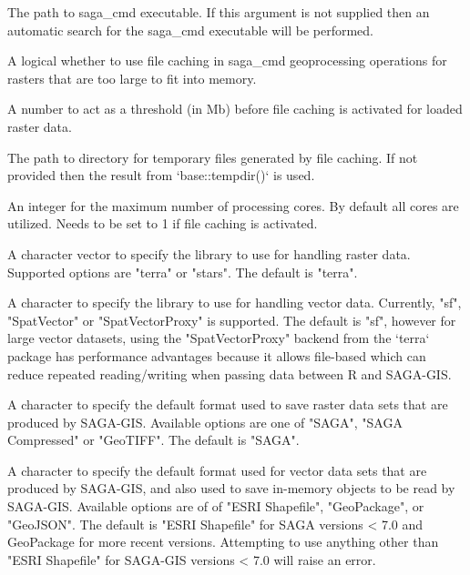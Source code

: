 \documentclass[a4paper]{book}
\begin{document}
%
\begin{Arguments}
\begin{ldescription}
\item[\code{saga\_bin}] The path to saga\_cmd executable. If this argument
is not supplied then an automatic search for the saga\_cmd executable will
be performed.

\item[\code{grid\_caching}] A logical whether to use file caching in saga\_cmd
geoprocessing operations for rasters that are too large to fit into memory.

\item[\code{grid\_cache\_threshold}] A number to act as a threshold (in Mb) before
file caching is activated for loaded raster data.

\item[\code{grid\_cache\_dir}] The path to directory for temporary files generated by
file caching. If not provided then the result from `base::tempdir()` is
used.

\item[\code{cores}] An integer for the maximum number of processing cores. By
default all cores are utilized. Needs to be set to 1 if file caching is
activated.

\item[\code{raster\_backend}] A character vector to specify the library to use for
handling raster data. Supported options are "terra" or "stars".
The default is "terra".

\item[\code{vector\_backend}] A character to specify the library to use for handling
vector data. Currently, "sf", "SpatVector" or "SpatVectorProxy" is
supported. The default is "sf", however for large vector datasets, using
the "SpatVectorProxy" backend from the `terra` package has performance
advantages because it allows file-based which can reduce repeated
reading/writing when passing data between R and SAGA-GIS.

\item[\code{raster\_format}] A character to specify the default format used to save
raster data sets that are produced by SAGA-GIS. Available options are one
of "SAGA", "SAGA Compressed" or "GeoTIFF". The default is "SAGA".

\item[\code{vector\_format}] A character to specify the default format used for
vector data sets that are produced by SAGA-GIS, and also used to save
in-memory objects to be read by SAGA-GIS. Available options are of of "ESRI
Shapefile", "GeoPackage", or "GeoJSON". The default is "ESRI Shapefile" for
SAGA versions < 7.0 and GeoPackage for more recent versions. Attempting to
use anything other than "ESRI Shapefile" for SAGA-GIS versions < 7.0 will
raise an error.


\end{ldescription}
\end{Arguments}
\end{document}
